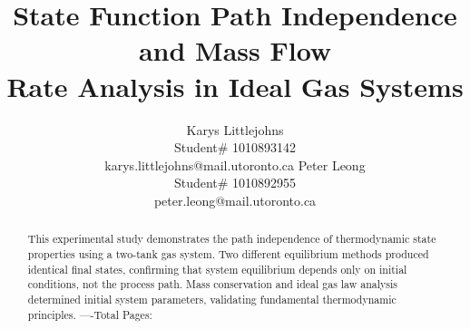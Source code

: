 \documentclass{article} %
\title{State Function Path Independence and Mass Flow \\
Rate Analysis in Ideal Gas Systems}
\author{Karys Littlejohns\\
Student\# 1010893142 \\
karys.littlejohns@mail.utoronto.ca
\And
Peter Leong \\
Student\# 1010892955 \\
peter.leong@mail.utoronto.ca 
}
\begin{document}
\maketitle

\vspace{-3ex}
\doublespacing

\begin{abstract}
This experimental study demonstrates the path independence of thermodynamic state properties using a two-tank gas system. Two different equilibrium methods produced identical final states, confirming that system equilibrium depends only on initial conditions, not the process path. Mass conservation and ideal gas law analysis determined initial system parameters, validating fundamental thermodynamic principles.
----Total Pages: \pageref{last_page}
\end{abstract}

\vspace{2ex}
\end{document}
